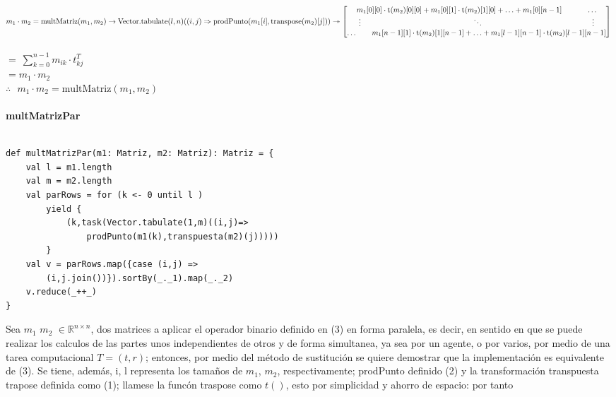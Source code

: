 \documentclass[12pt, a4paper]{article}
\begin{document}
\begin{math} m_1 \cdot m_2 = \text{{multMatriz}}(m_1, m_2) \\ \rightarrow
    \text{{Vector.tabulate}}(l, n)((i, j) \Rightarrow \text{{prodPunto}}(m_1[i], \text{{transpose}}(m_2)[j])) \\ \\
    \twoheadrightarrow \begin{bmatrix}
        m_1[0][0] \cdot \text{{t}}(m_2)[0][0] +  m_1[0][1] \cdot \text{{t}}(m_2)[1][0]  + 
       \ldots +  m_1[0][n-1] ~~~~~~~~~~ \ldots\\
         \vdots ~~~~~~~~~~~~~~~~~~~~~~~~~~~~~~~~~~~~~~~~~~~~~ \ddots ~~~~~~~~~~~~~~~~~~~~~~~~~~~~~~~~~~~~~~~~~~~~ \vdots \\
         \ldots ~~~~~~m_1[n-1][1] \cdot \text{{t}}(m_2)[1][n-1] + \ldots + m_1[l-1][n-1] \cdot \text{{t}}(m_2)[l-1][n-1] \\
        \end{bmatrix} \\
\end{math}\\ \\
$ =~\sum_{k=0}^{n-1} m_{ik} \cdot t_{kj}^T$ \\
$= m_1 \cdot m_2$
\\ $\therefore ~~~m_1 \cdot m_2 =\text{{multMatriz}}(m_1, m_2)$ \\ \\

\textbf{{multMatrizPar}} \\ \\
\begin{lstlisting}[caption=mult matriz paralela, label=lst:scala_code7]
def multMatrizPar(m1: Matriz, m2: Matriz): Matriz = {
    val l = m1.length
    val m = m2.length
    val parRows = for (k <- 0 until l ) 
        yield {
            (k,task(Vector.tabulate(1,m)((i,j)=>
                prodPunto(m1(k),transpuesta(m2)(j)))))
        }
    val v = parRows.map({case (i,j) => 
        (i,j.join())}).sortBy(_._1).map(_._2)
    v.reduce(_++_)
}
\end{lstlisting}
Sea $m_1$ $m_2$ $\in \mathbb{R}^{n \times n}$, dos matrices a aplicar el operador binario definido en (3) en forma paralela, es decir,
en sentido en que se puede realizar los calculos de las partes unos independientes de otros y de forma simultanea, ya sea por un agente, o por varios, por medio de una
tarea computacional $T = (t, r)$; entonces, por medio del método de sustitución se quiere demostrar que la implementación es equivalente de (3). Se tiene, además,
i, l representa los tamaños de $m_1$, $m_2$, respectivamente; prodPunto definido (2) y la transformación transpuesta trapose definida como (1); llamese la funcón traspose como $t()$, esto por simplicidad y ahorro de espacio: por tanto
    
\end{document}
